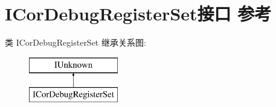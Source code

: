 \hypertarget{interface_i_cor_debug_register_set}{}\section{I\+Cor\+Debug\+Register\+Set接口 参考}
\label{interface_i_cor_debug_register_set}
类 I\+Cor\+Debug\+Register\+Set 继承关系图\+:\begin{figure}[H]
\begin{center}
\leavevmode
\includegraphics[height=2.000000cm]{interface_i_cor_debug_register_set}
\end{center}
\end{figure}
